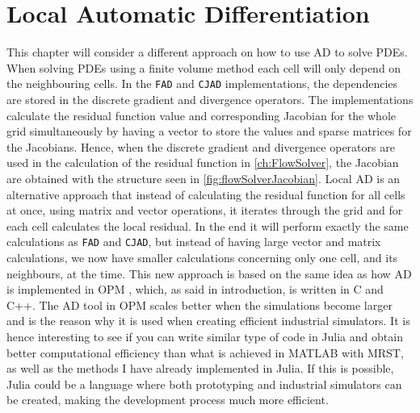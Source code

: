 \chapter{Local Automatic Differentiation}
\label{ch:LocalAD}
This chapter will consider a different approach on how to use AD to solve PDEs. When solving PDEs using a finite volume method each cell will only depend on the neighbouring cells. In the \texttt{FAD} and \texttt{CJAD} implementations, the dependencies are stored in the discrete gradient and divergence operators. The implementations calculate the residual function value and corresponding Jacobian for the whole grid simultaneously by having a vector to store the values and sparse matrices for the Jacobians. Hence, when the discrete gradient and divergence operators are used in the calculation of the residual function in \autoref{ch:FlowSolver}, the Jacobian are obtained with the structure seen in \autoref{fig:flowSolverJacobian}. Local AD is an alternative approach that instead of calculating the residual function for all cells at once, using matrix and vector operations, it iterates through the grid and for each cell calculates the local residual. In the end it will perform exactly the same calculations as \texttt{FAD} and \texttt{CJAD}, but instead of having large vector and matrix calculations, we now have smaller calculations concerning only one cell, and its neighbours, at the time. This new approach is based on the same idea as how AD is implemented in OPM \emph{\citep{opm}}, which, as said in introduction, is written in C and C++. The AD tool in OPM scales better when the simulations become larger and is the reason why it is used when creating efficient industrial simulators. It is hence interesting to see if you can write similar type of code in Julia and obtain better computational efficiency than what is achieved in MATLAB with MRST, as well as the methods I have already implemented in Julia. If this is possible, Julia could be a language where both prototyping and industrial simulators can be created, making the development process much more efficient. 

